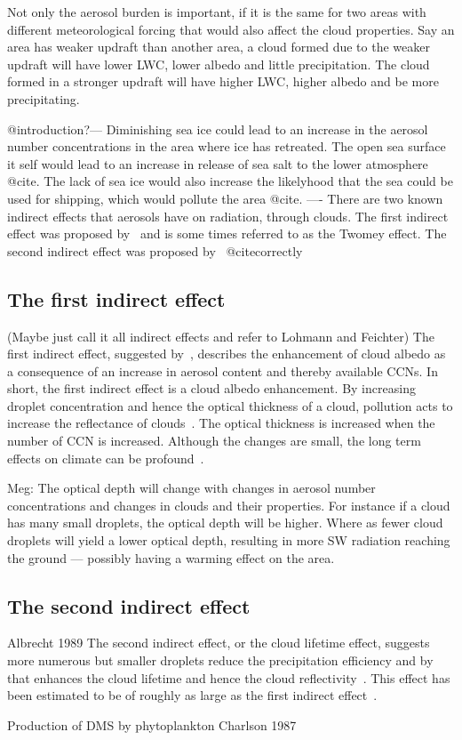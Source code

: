 Not only the aerosol burden is important, if it is the same for two areas with different meteorological forcing that would also affect the cloud properties. Say an area has weaker updraft than another area, a cloud formed due to the weaker updraft will have lower LWC, lower albedo and little precipitation. The cloud formed in a stronger updraft will have higher LWC, higher albedo and be more precipitating.

@introduction?---
Diminishing sea ice could lead to an increase in the aerosol number concentrations in the area where ice has retreated. The open sea surface it self would lead to an increase in release of sea salt to the lower atmosphere @cite. The lack of sea ice would also increase the likelyhood that the sea could be used for shipping, which would pollute the area @cite.
----
There are two known indirect effects that aerosols have on radiation, through clouds. The first indirect effect was proposed by~\cite{Twomey1974} and is some times referred to as the Twomey effect. The second indirect effect was proposed by~\cite{Albrecht1989} @citecorrectly 

\subsection{The first indirect effect} (Maybe just call it all indirect effects and refer to Lohmann and Feichter)
The first indirect effect, suggested by~\cite{Twomey1974}, describes the enhancement of cloud albedo as a consequence of an increase in aerosol content and thereby available CCNs.
In short, the first indirect effect is a cloud albedo enhancement.
By increasing droplet concentration and hence the optical thickness of a cloud, pollution acts to increase the reflectance of clouds~\citep{Twomey1977}. 
The optical thickness is increased when the number of CCN is increased. Although the changes are small, the long term effects on climate can be profound~\citep{Twomey1974}.

Meg: The optical depth will change with changes in aerosol number concentrations and changes in clouds and their properties. For instance if a cloud has many small droplets, the optical depth will be higher. Where as  fewer cloud droplets will yield a lower optical depth, resulting in more SW radiation reaching the ground — possibly having a warming effect on the area. 


\subsection{The second indirect effect}
Albrecht 1989 
The second indirect effect, or the cloud lifetime effect, suggests more numerous but smaller droplets reduce the precipitation efficiency and by that enhances the cloud lifetime and hence the cloud reflectivity~\citep{Albrecht1989}. This effect has been estimated to be of roughly as large as the first indirect effect~\citep{Lohmann2005}.


Production of DMS by phytoplankton Charlson 1987


